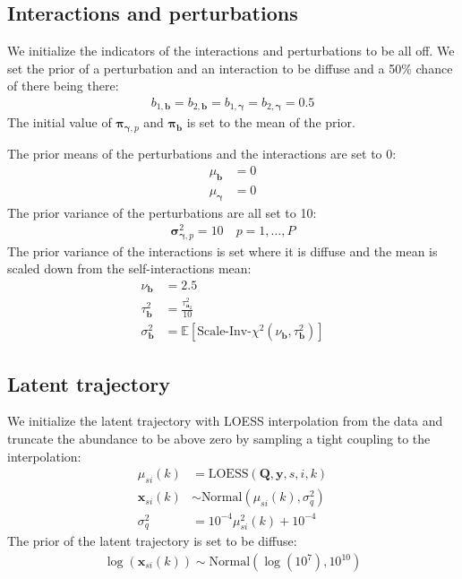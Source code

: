 \documentclass{article}
\newcommand{\Normaldist}{\text{Normal}}
\newcommand{\ScaledInvChiSquareddist}{\text{Scale-Inv-}\chi^2}
\newcommand{\si}{\mathbf{a}_2}
\newcommand{\scalesi}{\tau^2_{\si}}
\newcommand{\interact}{\mathbf{b}}
\newcommand{\varinteract}{\sigma^2_{\interact}}
\newcommand{\dofinteract}{\nu_{\interact}}
\newcommand{\scaleinteract}{\tau^2_{\interact}}
\newcommand{\probinteract}{\mathbf{\pi}_{\interact}}
\newcommand{\pert}{\mathbf{\gamma}}
\newcommand{\varperti}[1]{\mathbf{\sigma}^2_{\pert, #1}}
\newcommand{\probperti}[1]{\mathbf{\pi}_{\pert, #1}}
\newcommand{\musik}[3]{\mu_{#1 #2}(#3)}
\newcommand{\musikexp}[4]{\mu^{#4}_{#1 #2}(#3)}
\newcommand{\xsik}[3]{\mathbf{x}_{#1 #2}(#3)}
\begin{document}
\subsection{Interactions and perturbations}
We initialize the indicators of the interactions and perturbations to be all off. We set the prior of a perturbation and an interaction to be diffuse and a 50\% chance of there being there:
\begin{align}
    b_{1,\interact} = b_{2,\interact} = b_{1,\pert} = b_{2,\pert} = 0.5 
\end{align}
The initial value of $\probperti{p}$ and $\probinteract$ is set to the mean of the prior.

The prior means of the perturbations and the interactions are set to 0:
\begin{align}
    \mu_{\interact} & = 0 \\
    \mu_{\pert} & = 0
\end{align}
The prior variance of the perturbations are all set to 10:
\begin{align}
    \varperti{p} = 10 \quad p = 1, \dots, P
\end{align}
The prior variance of the interactions is set where it is diffuse and the mean is scaled down from the self-interactions mean: 
\begin{align}
    \dofinteract & = 2.5 \\
    \scaleinteract & = \frac{\scalesi}{10} \\
    \varinteract & = \mathbb{E}[\ScaledInvChiSquareddist (
        \dofinteract, \scaleinteract)]
\end{align}

\subsection{Latent trajectory}
We initialize the latent trajectory with LOESS interpolation from the data and truncate the abundance to be above zero by sampling a tight coupling to the interpolation:
\begin{align}
    \musik{s}{i}{k} & = \text{LOESS}(\mathbf{Q}, \mathbf{y}, s, i, k) \\
    \xsik{s}{i}{k} & \sim \Normaldist \left(
        \musik{s}{i}{k} , \sigma^2_q \right) \\
    \sigma^2_q & = 10^{-4} \musikexp{s}{i}{k}{2} + 10^{-4}
\end{align}
The prior of the latent trajectory is set to be diffuse:
\begin{align}
    \log ( \xsik{s}{i}{k} ) \sim \Normaldist ( \log (10^7) , 10^{10})
\end{align}
\end{document}
